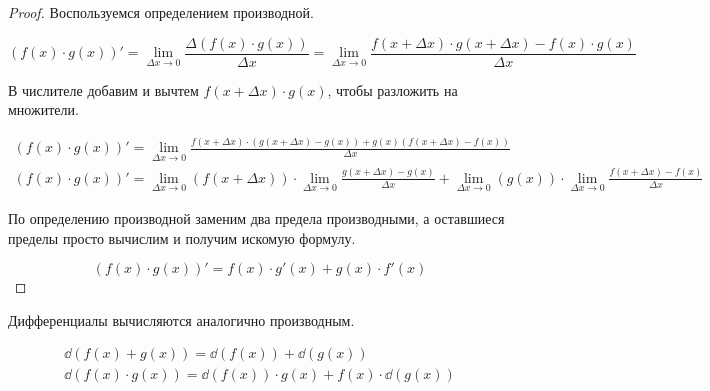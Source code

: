 \begin{proof}
  Воспользуемся определением производной.

  \begin{equation*}
    (f(x) \cdot g(x))'
    = \lim_{\Delta x \to 0} \frac{\Delta(f(x) \cdot g(x))}{\Delta x}
    = \lim_{\Delta x \to 0} \frac{f(x + \Delta x) \cdot g(x + \Delta x) - f(x)
      \cdot g(x)}{\Delta x}
  \end{equation*}

  В числителе добавим и вычтем \(f(x + \Delta x) \cdot g(x)\), чтобы разложить
  на множители.

  \begin{equation*}
    \begin{aligned}
      (f(x) \cdot g(x))'
      = \lim_{\Delta x \to 0} \frac{f(x + \Delta x) \cdot (g(x + \Delta x) - g(x))
        + g(x) (f(x + \Delta x) - f(x))}{\Delta x}
    \\
      (f(x) \cdot g(x))'
      = \lim_{\Delta x \to 0} (f(x + \Delta x)) \cdot
        \lim_{\Delta x \to 0} \frac{g(x + \Delta x) - g(x)}{\Delta x}
        + \lim_{\Delta x \to 0} (g(x)) \cdot
        \lim_{\Delta x \to 0} \frac{f(x + \Delta x) - f(x)}{\Delta x}
    \end{aligned}
  \end{equation*}

  По определению производной заменим два предела производными, а оставшиеся
  пределы просто вычислим и получим искомую формулу.

  \begin{equation*}
    (f(x) \cdot g(x))' = f(x) \cdot g'(x) + g(x) \cdot f'(x)
  \end{equation*}
\end{proof}

\begin{remark}
  Дифференциалы вычисляются аналогично производным.

  \begin{equation*}
    \begin{aligned}
      \dd (f(x) + g(x)) = \dd (f(x)) + \dd (g(x))
    \\
      \dd (f(x) \cdot g(x)) = \dd (f(x)) \cdot g(x) + f(x) \cdot \dd (g(x))
    \end{aligned}
  \end{equation*}
\end{remark}